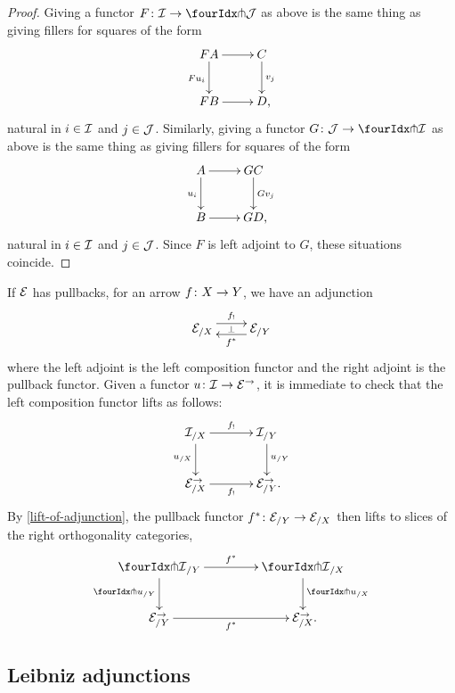 \documentclass[reqno,10pt,a4paper,oneside,draft]{amsart}
\begin{document}
\begin{proof}
Giving a functor $F \co \cal{I} \to \liftl{\cal{J}}$ as above is the same thing as giving fillers for squares of the form
\[
\xymatrix{
  F A
  \ar[d]_{F u_i}
  \ar[r]
&
  C \ar[d]^{v_j}
\\
  F B
  \ar[r]
&
  D
\rlap{,}}
\]
natural in $i \in \cal{I}$ and $j \in \cal{J}$.
Similarly, giving a functor $G \co \cal{J} \to \liftl{\cal{I}}$ as above is the same thing as giving fillers for squares of the form
\[
\xymatrix{
  A
  \ar[d]_{u_i}
  \ar[r]
&
  G C
  \ar[d]^{G v_j}
\\
  B
  \ar[r]
&
  G D
\rlap{,}}
\]
natural in $i \in \cal{I}$ and $j \in \cal{J}$.
Since $F$ is left adjoint to $G$, these situations coincide.
\end{proof}

\begin{example} \label{exa:composition-pullback-lift}
If $\cal{E}$ has pullbacks, for an arrow $f \co X \to Y$, we have an adjunction
\[
\xymatrix{
  \catE_{/X}
  \ar@<1ex>[r]^{f_!}
  \ar@{}[r]|{\bot}
&
  \catE_{/Y}
  \ar@<1ex>[l]^{f^*}
}
\]
where the left adjoint is the left composition functor and the right adjoint is the pullback functor.
Given a functor $u \co \cal{I} \to \catE^\to$, it is immediate to check that the left composition functor lifts as follows:
\[
\xymatrix@C+1em{
  \cal{I}_{/X}
  \ar[r]^-{f_!}
  \ar[d]_{u_{/X}}
&
  \cal{I}_{/Y}
  \ar[d]^{u_{/Y}}
\\
  \calE_{/X}^\to
  \ar[r]_-{f_!}
&
  \calE_{/Y}^\to
\rlap{.}}
\]
By \cref{lift-of-adjunction}, the pullback functor $f^* \co \catE_{/Y} \to \catE_{/X}$ then lifts to slices of the right orthogonality categories,
\[
\xymatrix@C=1.5cm{
  \liftr{\cal{I}}_{/Y}
  \ar[d]_{{\liftr{u}}_{/Y}}
  \ar[r]^{f^*}
&
  \liftr{\cal{I}}_{/X}
  \ar[d]^{{\liftr{u}}_{/X}}
\\
  {\catE}_{/Y}^\to
  \ar[r]_{f^*}
&
  \catE_{/X}^\to
\rlap{.}}
\]
\end{example}

\subsection*{Leibniz adjunctions}
\end{document}
